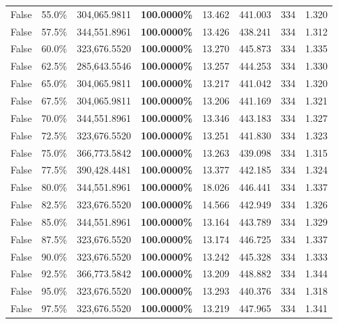 \begin{table}[H]
\begin{tabular}{lllrllll}
\cline{1-8}
False & 55.0\% & 304,065.9811 & \bfseries \color{red} 100.0000\% & 13.462 & 441.003 & 334 & 1.320 \\
\cline{1-8}
False & 57.5\% & 344,551.8961 & \bfseries \color{red} 100.0000\% & 13.426 & 438.241 & 334 & 1.312 \\
\cline{1-8}
False & 60.0\% & 323,676.5520 & \bfseries \color{red} 100.0000\% & 13.270 & 445.873 & 334 & 1.335 \\
\cline{1-8}
False & 62.5\% & \color{red} 285,643.5546 & \bfseries \color{red} 100.0000\% & 13.257 & 444.253 & 334 & 1.330 \\
\cline{1-8}
False & 65.0\% & 304,065.9811 & \bfseries \color{red} 100.0000\% & 13.217 & 441.042 & 334 & 1.320 \\
\cline{1-8}
False & 67.5\% & 304,065.9811 & \bfseries \color{red} 100.0000\% & 13.206 & 441.169 & 334 & 1.321 \\
\cline{1-8}
False & 70.0\% & 344,551.8961 & \bfseries \color{red} 100.0000\% & 13.346 & 443.183 & 334 & 1.327 \\
\cline{1-8}
False & 72.5\% & 323,676.5520 & \bfseries \color{red} 100.0000\% & 13.251 & 441.830 & 334 & 1.323 \\
\cline{1-8}
False & 75.0\% & 366,773.5842 & \bfseries \color{red} 100.0000\% & 13.263 & 439.098 & 334 & 1.315 \\
\cline{1-8}
False & 77.5\% & 390,428.4481 & \bfseries \color{red} 100.0000\% & 13.377 & 442.185 & 334 & 1.324 \\
\cline{1-8}
False & 80.0\% & 344,551.8961 & \bfseries \color{red} 100.0000\% & 18.026 & 446.441 & 334 & 1.337 \\
\cline{1-8}
False & 82.5\% & 323,676.5520 & \bfseries \color{red} 100.0000\% & 14.566 & 442.949 & 334 & 1.326 \\
\cline{1-8}
False & 85.0\% & 344,551.8961 & \bfseries \color{red} 100.0000\% & 13.164 & 443.789 & 334 & 1.329 \\
\cline{1-8}
False & 87.5\% & 323,676.5520 & \bfseries \color{red} 100.0000\% & 13.174 & 446.725 & 334 & 1.337 \\
\cline{1-8}
False & 90.0\% & 323,676.5520 & \bfseries \color{red} 100.0000\% & 13.242 & 445.328 & 334 & 1.333 \\
\cline{1-8}
False & 92.5\% & 366,773.5842 & \bfseries \color{red} 100.0000\% & 13.209 & 448.882 & 334 & 1.344 \\
\cline{1-8}
False & 95.0\% & 323,676.5520 & \bfseries \color{red} 100.0000\% & 13.293 & 440.376 & 334 & 1.318 \\
\cline{1-8}
False & 97.5\% & 323,676.5520 & \bfseries \color{red} 100.0000\% & 13.219 & 447.965 & 334 & 1.341 \\
\cline{1-8}
\bottomrule
\end{tabular}
\end{table}
